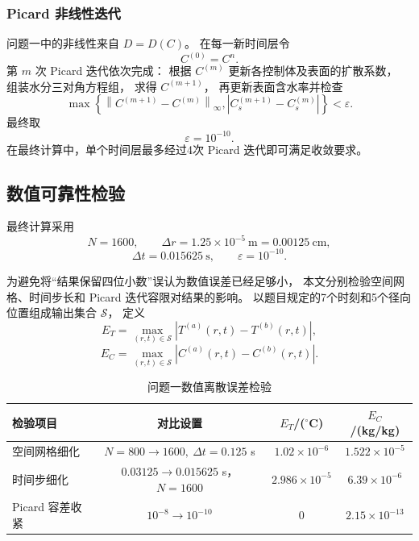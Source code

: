 \documentclass[UTF8,a4paper,12pt]{ctexart}
\begin{document}
\subsubsection{Picard 非线性迭代}

问题一中的非线性来自 $D=D(C)$。
在每一新时间层令
\begin{equation}
C^{(0)}=C^n.
\end{equation}
第 $m$ 次 Picard 迭代依次完成：
根据 $C^{(m)}$ 更新各控制体及表面的扩散系数，
组装水分三对角方程组，
求得 $C^{(m+1)}$，
再更新表面含水率并检查
\begin{equation}
\max
\left\{
\left\|C^{(m+1)}-C^{(m)}\right\|_\infty,
\left|C_s^{(m+1)}-C_s^{(m)}\right|
\right\}
<\varepsilon.
\end{equation}
最终取
\begin{equation}
\varepsilon=10^{-10}.
\end{equation}
在最终计算中，单个时间层最多经过4次 Picard 迭代即可满足收敛要求。

\subsection{数值可靠性检验}

最终计算采用
\begin{equation}
N=1600,\qquad
\Delta r=1.25\times10^{-5}\ \mathrm m
=0.00125\ \mathrm{cm},
\end{equation}
\begin{equation}
\Delta t=0.015625\ \mathrm{s},
\qquad
\varepsilon=10^{-10}.
\end{equation}

为避免将“结果保留四位小数”误认为数值误差已经足够小，
本文分别检验空间网格、时间步长和 Picard 迭代容限对结果的影响。
以题目规定的7个时刻和5个径向位置组成输出集合 $\mathcal S$，
定义
\begin{equation}
E_T
=
\max_{(r,t)\in\mathcal S}
\left|
T^{(a)}(r,t)-T^{(b)}(r,t)
\right|,
\end{equation}
\begin{equation}
E_C
=
\max_{(r,t)\in\mathcal S}
\left|
C^{(a)}(r,t)-C^{(b)}(r,t)
\right|.
\end{equation}

\begin{table}[H]
\centering
\caption{问题一数值离散误差检验}
\begin{tabular}{lccc}
\toprule
检验项目 & 对比设置 & $E_T$/($^\circ$C) & $E_C$/(kg/kg)\\
\midrule
空间网格细化
& $N=800\rightarrow1600,\ \Delta t=0.125$ s
& $1.02\times10^{-6}$
& $1.522\times10^{-5}$\\
时间步细化
& $0.03125\rightarrow0.015625$ s，$N=1600$
& $2.986\times10^{-5}$
& $6.39\times10^{-6}$\\
Picard 容差收紧
& $10^{-8}\rightarrow10^{-10}$
& $0$
& $2.15\times10^{-13}$\\
\bottomrule
\end{tabular}
\end{table}
\end{document}
